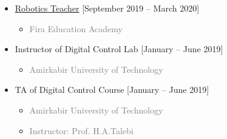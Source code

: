 \documentclass[10pt,a4paper,sans]{moderncv} %
\begin{document}
\begin{itemize}
			\item {} \href{https://ramantech.academy/}{Robotics Teacher} \hfill [September 2019 -- March 2020]
			\begin{itemize}
				\item \textcolor{gray}{Fira Education Academy}
			\end{itemize}	

        \item {} Instructor of Digital Control Lab \hfill [January -- June 2019]
			\begin{itemize}
				\item \textcolor{gray}{Amirkabir University of Technology}
			\end{itemize}	
        \item {} TA of Digital Control Course \hfill [January -- June 2019]
			\begin{itemize}
				\item \textcolor{gray}{Amirkabir University of Technology}
				\item \textcolor{gray}{Instructor: Prof. H.A.Talebi}
			\end{itemize}				
		\end{itemize}
\end{document}
